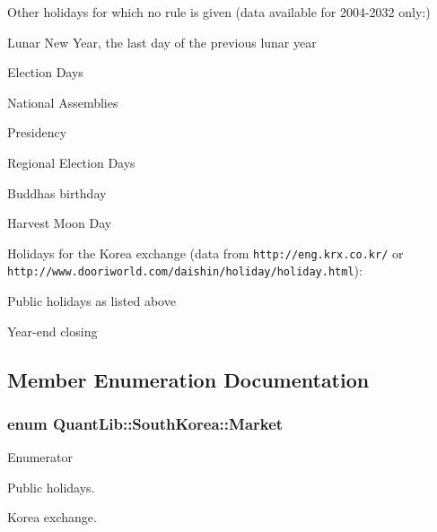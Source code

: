 Other holidays for which no rule is given (data available for 2004-\/2032 only\+:) 
\begin{DoxyItemize}
\item Lunar New Year, the last day of the previous lunar year 
\item Election Days 
\item National Assemblies 
\item Presidency 
\item Regional Election Days 
\item Buddha\textquotesingle{}s birthday 
\item Harvest Moon Day 
\end{DoxyItemize}

Holidays for the Korea exchange (data from {\tt http\+://eng.\+krx.\+co.\+kr/} or {\tt http\+://www.\+dooriworld.\+com/daishin/holiday/holiday.\+html})\+: 
\begin{DoxyItemize}
\item Public holidays as listed above 
\item Year-\/end closing 
\end{DoxyItemize}

\subsection{Member Enumeration Documentation}
\subsubsection[{Market}]{\setlength{\rightskip}{0pt plus 5cm}enum {\bf Quant\+Lib\+::\+South\+Korea\+::\+Market}}\label{class_quant_lib_1_1_south_korea_a4294349968be0d753b543a9dd3443e97}
\begin{Desc}
\item[Enumerator]\par
\begin{description}
\item[{\em 
Settlement\label{class_quant_lib_1_1_south_korea_a4294349968be0d753b543a9dd3443e97af6ba39f1543da2c3cc805d47ac2a4dee}
}]Public holidays. \item[{\em 
K\+RX\label{class_quant_lib_1_1_south_korea_a4294349968be0d753b543a9dd3443e97a76d10308f1c8e2e2097ffa929c01ca16}
}]Korea exchange. \end{description}
\end{Desc}


